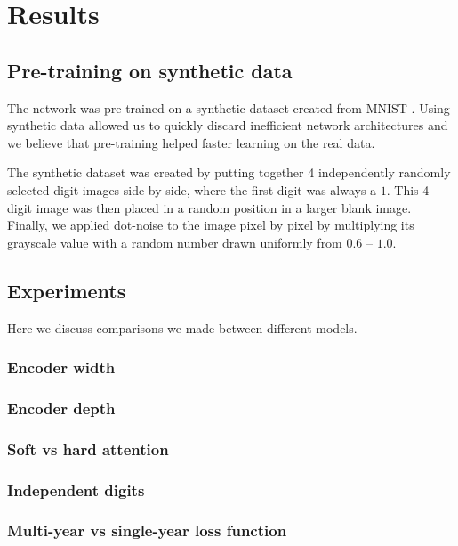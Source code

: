 \section{Results}

\subsection{Pre-training on synthetic data} \label{ssec:pretrain}
The network was pre-trained on a synthetic dataset created from MNIST \cite{MNIST_orig}. Using synthetic data allowed us to quickly discard inefficient network architectures and we believe that pre-training helped faster learning on the real data.

The synthetic dataset was created by putting together 4 independently randomly selected digit images side by side, where the first digit was always a $1$. This 4 digit image was then placed in a random position in a larger blank image. Finally, we applied dot-noise to the image pixel by pixel by multiplying its grayscale value with a random number drawn uniformly from $0.6$ -- $1.0$.


\subsection{Experiments}

Here we discuss comparisons we made between different models.

\subsubsection{Encoder width}

\subsubsection{Encoder depth}

\subsubsection{Soft vs hard attention}

\subsubsection{Independent digits} \label{sssec:ind_digits}

\subsubsection{Multi-year vs single-year loss function}
